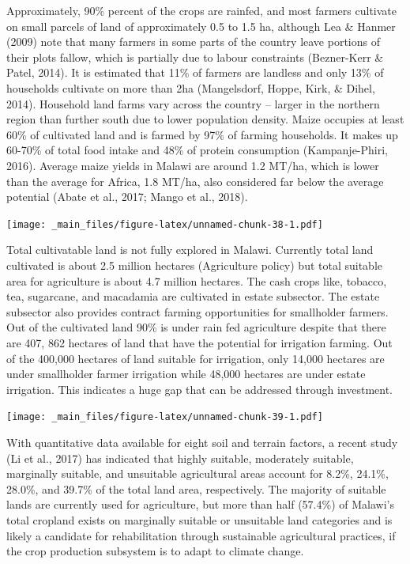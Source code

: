 \documentclass[
]{book}
\begin{document}
Approximately, 90\% percent of the crops are rainfed, and most farmers cultivate on small parcels of land of approximately 0.5 to 1.5 ha, although Lea \& Hanmer (2009) note that many farmers in some parts of the country leave portions of their plots fallow, which is partially due to labour constraints (Bezner-Kerr \& Patel, 2014). It is estimated that 11\% of farmers are landless and only 13\% of households cultivate on more than 2ha (Mangelsdorf, Hoppe, Kirk, \& Dihel, 2014). Household land farms vary across the country -- larger in the northern region than further south due to lower population density. Maize occupies at least 60\% of cultivated land and is farmed by 97\% of farming households. It makes up 60-70\% of total food intake and 48\% of protein consumption (Kampanje-Phiri, 2016). Average maize yields in Malawi are around 1.2 MT/ha, which is lower than the average for Africa, 1.8 MT/ha, also considered far below the average potential (Abate et al., 2017; Mango et al., 2018).

\texttt{[image: \_main\_files/figure-latex/unnamed-chunk-38-1.pdf]}

Total cultivatable land is not fully explored in Malawi. Currently total land cultivated is about 2.5 million hectares (Agriculture policy) but total suitable area for agriculture is about 4.7 million hectares. The cash crops like, tobacco, tea, sugarcane, and macadamia are cultivated in estate subsector. The estate subsector also provides contract farming opportunities for smallholder farmers. Out of the cultivated land 90\% is under rain fed agriculture despite that there are 407, 862 hectares of land that have the potential for irrigation farming. Out of the 400,000 hectares of land suitable for irrigation, only 14,000 hectares are under smallholder farmer irrigation while 48,000 hectares are under estate irrigation. This indicates a huge gap that can be addressed through investment.

\texttt{[image: \_main\_files/figure-latex/unnamed-chunk-39-1.pdf]}

With quantitative data available for eight soil and terrain factors, a recent study (Li et al., 2017) has indicated that highly suitable, moderately suitable, marginally suitable, and unsuitable agricultural areas account for 8.2\%, 24.1\%, 28.0\%, and 39.7\% of the total land area, respectively. The majority of suitable lands are currently used for agriculture, but more than half (57.4\%) of Malawi's total cropland exists on marginally suitable or unsuitable land categories and is likely a candidate for rehabilitation through sustainable agricultural practices, if the crop production subsystem is to adapt to climate change.
\end{document}
